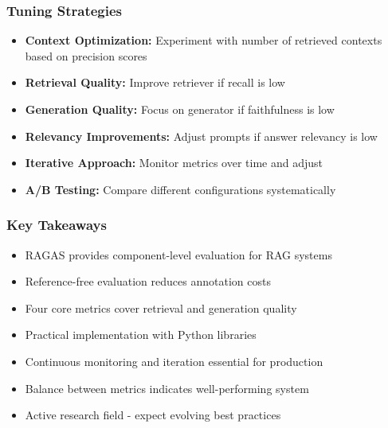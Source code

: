 \begin{frame}[fragile]\frametitle{Tuning Strategies}
  \begin{itemize}
    \item \textbf{Context Optimization:} Experiment with number of retrieved contexts based on precision scores
    \item \textbf{Retrieval Quality:} Improve retriever if recall is low
    \item \textbf{Generation Quality:} Focus on generator if faithfulness is low
    \item \textbf{Relevancy Improvements:} Adjust prompts if answer relevancy is low
    \item \textbf{Iterative Approach:} Monitor metrics over time and adjust
    \item \textbf{A/B Testing:} Compare different configurations systematically
  \end{itemize}
\end{frame}

\begin{frame}[fragile]\frametitle{Key Takeaways}
  \begin{itemize}
    \item RAGAS provides component-level evaluation for RAG systems
    \item Reference-free evaluation reduces annotation costs
    \item Four core metrics cover retrieval and generation quality
    \item Practical implementation with Python libraries
    \item Continuous monitoring and iteration essential for production
    \item Balance between metrics indicates well-performing system
    \item Active research field - expect evolving best practices
  \end{itemize}
\end{frame}